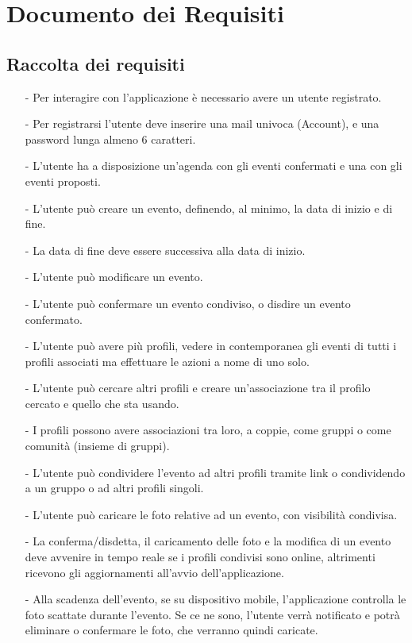 \newpage
\section{Documento dei Requisiti}

\subsection{Raccolta dei requisiti}

\begin{itemize}
  \item[-] Per interagire con l’applicazione è necessario avere un utente registrato.
  \item[-] Per registrarsi l’utente deve inserire una mail univoca (Account), e una password lunga almeno 6 caratteri.
  \item[-] L’utente ha a disposizione un’agenda con gli eventi confermati e una con gli eventi proposti.
  \item[-] L’utente può creare un evento, definendo, al minimo, la data di inizio e di fine.
  \item[-] La data di fine deve essere successiva alla data di inizio.
  \item[-] L’utente può modificare un evento.
  \item[-] L’utente può confermare un evento condiviso, o disdire un evento confermato.
  \item[-] L’utente può avere più profili, vedere in contemporanea gli eventi di tutti i profili associati ma effettuare le azioni a nome di uno solo.
  \item[-] L’utente può cercare altri profili e creare un’associazione tra il profilo cercato e quello che sta usando.
  \item[-] I profili possono avere associazioni tra loro, a coppie, come gruppi o come comunità (insieme di gruppi).
  \item[-] L’utente può condividere l’evento ad altri profili tramite link o condividendo a un gruppo o ad altri profili singoli.
  \item[-] L’utente può caricare le foto relative ad un evento, con visibilità condivisa.
  \item[-] La conferma/disdetta, il caricamento delle foto e la modifica di un evento deve avvenire in tempo reale se i profili condivisi sono online, altrimenti ricevono gli aggiornamenti all’avvio dell’applicazione.
  \item[-] Alla scadenza dell’evento, se su dispositivo mobile, l’applicazione controlla le foto scattate durante l’evento. Se ce ne sono, l’utente verrà notificato e potrà eliminare o confermare le foto, che verranno quindi caricate.
\end{itemize}


